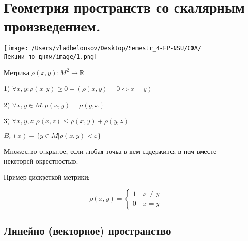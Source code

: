 \documentclass[12pt, a4paper]{report}
\begin{document}
\fi


\chapter{Геометрия пространств со скалярным произведением.}

\begin{center}
    \texttt{[image: /Users/vladbelousov/Desktop/Semestr\_4-FP-NSU/ОФА/Лекции\_по\_дням/image/1.png]}
\end{center}

\begin{definition}
    Метрика \( \rho (x,y): M ^2 \to  \mathbb{R} \) 

    1) \( \forall x,y :\rho (x,y ) \geq 0 - ( \rho(x,y) = 0 \Leftrightarrow x=y)   \) 

    2) \( \forall x,y \in  M :\rho(x,y )= \rho (y,x)  \)
    
    3) \( \forall x,y,z :\rho(x,z) \le  \rho(x,y)+\rho(y,z) \)
\end{definition}

\( B_{\varepsilon}(x) = \{ y \in  M | \rho(x,y) < \varepsilon \} \) 

\begin{definition}
    Множество открытое, если любая точка в нем содержится в нем вместе некоторой окрестностью.
\end{definition}

Пример дискреткой метрики: 

\[ 
\rho(x,y) = 
\begin{cases} 
    1 \quad x \neq y \\
    0 \quad  x=y   
\end{cases} 
\] 

\section{Линейно (векторное) пространство}
\end{document}
